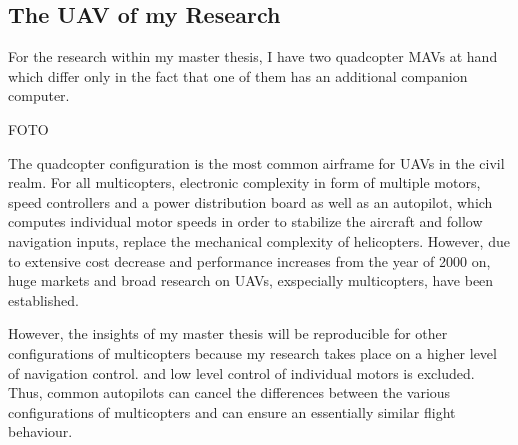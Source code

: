 
\subsection{The UAV of my Research} \label{Chapter2Section1Sub3}


For the research within my master thesis,
I have two quadcopter MAVs at hand
which differ only in the fact that
one of them has an additional companion
computer.

FOTO



The quadcopter configuration is the most common
airframe for UAVs in the civil realm. 
For all multicopters,
electronic complexity in form of multiple motors,
speed controllers and a power distribution board
as well as an autopilot,
which computes individual motor speeds in order to
stabilize the aircraft and follow navigation inputs,
replace the mechanical complexity of
helicopters. 
However, due to extensive cost decrease
and performance increases from the year of 2000 on,
huge markets and broad research on UAVs, exspecially multicopters,
have been established.



However, the insights of my master thesis
will be reproducible for other configurations
of multicopters because my research
takes place on a higher level of navigation control.
and low level control of individual motors is excluded.
Thus, common autopilots can
cancel the differences between the various
configurations of multicopters and can ensure
an essentially similar flight behaviour.








